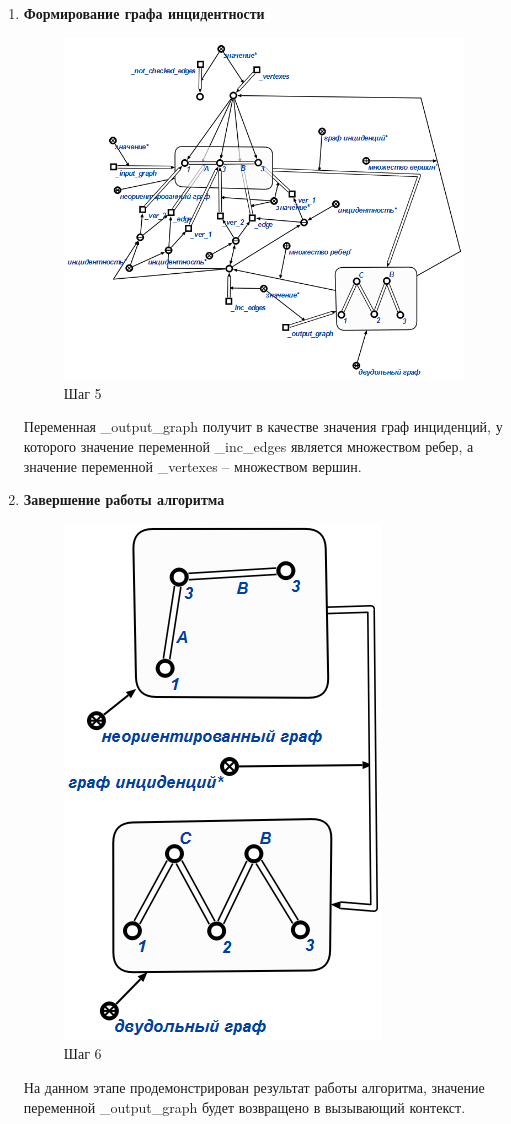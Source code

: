 \begin{enumerate}
\item
\textbf{Формирование графа инцидентности}
\begin{figure}[H]
  \centering
  \includegraphics[scale=0.7]{algo/5.png}
  \caption{Шаг 5}
\end{figure}
Переменная \_output\_graph получит в качестве значения граф инциденций, у которого значение переменной \_inc\_edges является множеством ребер, а значение переменной \_vertexes -- множеством вершин.

\item
\textbf{Завершение работы алгоритма}
\begin{figure}[H]
  \centering
  \includegraphics[scale=0.7]{images/16.png}
  \caption{Шаг 6}
\end{figure}
На данном этапе продемонстрирован результат работы алгоритма, значение переменной \_output\_graph будет возвращено в вызывающий контекст.

\end{enumerate}
